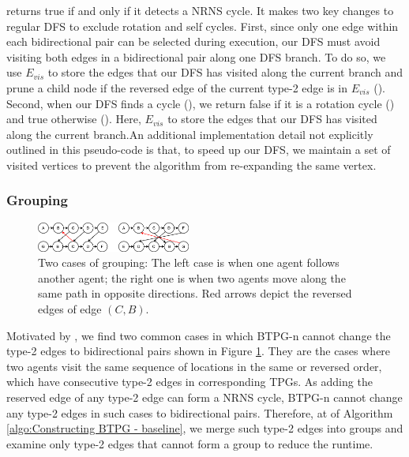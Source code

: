 \documentclass[letterpaper]{article} %
\theoremstyle{definition}
\begin{document}
 returns true if and only if it detects a NRNS cycle. It makes two key changes to regular DFS to exclude rotation and self cycles.  
First, since only one edge within each bidirectional pair can be selected during execution, our DFS must avoid visiting both edges in a bidirectional pair along one DFS branch. To do so, we use $E_{vis}$ to store the edges that our DFS has visited along the current branch and prune a child node if the reversed edge of the current type-2 edge is in $E_{vis}$ ().
Second, when our DFS finds a cycle (), we return false if it is a rotation cycle () and true otherwise (). Here, $E_{vis}$ to store the edges that our DFS has visited along the current branch.An additional implementation detail not explicitly outlined in this pseudo-code is that, to speed up our DFS, we maintain a set of visited vertices to prevent the algorithm from re-expanding the same vertex.


\subsubsection{Grouping}
\begin{figure}[t]
         \centering
         \includegraphics[width=0.45\textwidth]{Figs/groups.png}
     
        \caption{Two cases of grouping: The left case is when one agent follows another agent; the right one is when two agents move along the same path in opposite directions. Red arrows depict the reversed edges of edge $(C,B)$.}
        \label{fig:three TPGs}
\end{figure}

Motivated by \cite{berndt_feedback_2020}, we find two common cases in which BTPG-n cannot change the type-2 edges to bidirectional pairs shown in Figure \ref{fig:three TPGs}. They are the cases where two agents visit the same sequence of locations in the same or reversed order, which have consecutive type-2 edges in corresponding TPGs. As adding the reserved edge of any type-2 edge can form a NRNS cycle, BTPG-n cannot change any type-2 edges in such cases to bidirectional pairs.
Therefore, at  of Algorithm \ref{algo:Constructing BTPG - baseline}, we merge such type-2 edges into groups and examine only type-2 edges that cannot form a group to reduce the runtime.
\end{document}

